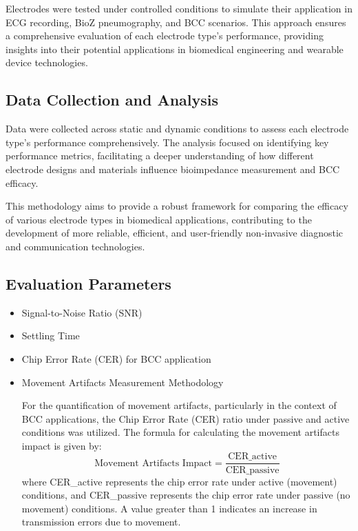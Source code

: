 \documentclass[conference]{IEEEtran}
\begin{document}
Electrodes were tested under controlled conditions to simulate their application in ECG recording, BioZ pneumography, and BCC scenarios. This approach ensures a comprehensive evaluation of each electrode type's performance, providing insights into their potential applications in biomedical engineering and wearable device technologies.

\subsection{Data Collection and Analysis}
Data were collected across static and dynamic conditions to assess each electrode type's performance comprehensively. The analysis focused on identifying key performance metrics, facilitating a deeper understanding of how different electrode designs and materials influence bioimpedance measurement and BCC efficacy.

This methodology aims to provide a robust framework for comparing the efficacy of various electrode types in biomedical applications, contributing to the development of more reliable, efficient, and user-friendly non-invasive diagnostic and communication technologies.


\subsection{Evaluation Parameters}
\begin{itemize}
    \item Signal-to-Noise Ratio (SNR)
    \item Settling Time
    \item Chip Error Rate (CER) for BCC application
    \item Movement Artifacts Measurement Methodology
    
For the quantification of movement artifacts, particularly in the context of BCC applications, the Chip Error Rate (CER) ratio under passive and active conditions was utilized. The formula for calculating the movement artifacts impact is given by:
\begin{equation}
    \text{Movement Artifacts Impact} = \frac{\text{CER\_active}}{\text{CER\_passive}}
\end{equation}
where CER\_active represents the chip error rate under active (movement) conditions, and CER\_passive represents the chip error rate under passive (no movement) conditions. A value greater than 1 indicates an increase in transmission errors due to movement.

\end{itemize}
\end{document}
